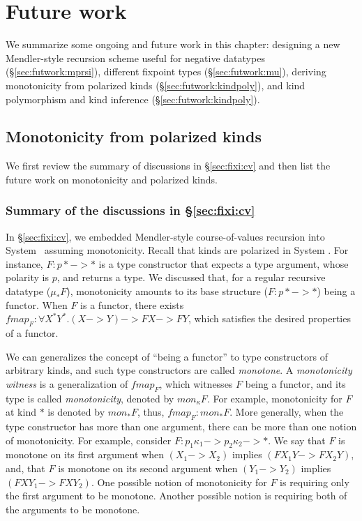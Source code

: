 \chapter{Future work}\label{ch:futwork}
We summarize some ongoing and future work in this chapter:
designing a new Mendler-style recursion scheme
useful for negative datatypes (\S\ref{sec:futwork:mprsi}),
different fixpoint types (\S\ref{sec:futwork:mu}),
deriving monotonicity from polarized kinds (\S\ref{sec:futwork:kindpoly}), and
kind polymorphism and kind inference (\S\ref{sec:futwork:kindpoly}).



\section{Monotonicity from polarized kinds}\label{sec:futwork:mon}
We first review the summary of discussions in \S\ref{sec:fixi:cv}
and then list the future work on monotonicity and polarized kinds.

\subsection*{Summary of the discussions in \S\ref{sec:fixi:cv}}
In \S\ref{sec:fixi:cv}, we embedded Mendler-style course-of-values recursion
into System \Fixi\ assuming monotonicity. Recall that kinds are polarized in
System \Fixi. For instance, $F: p* -> *$ is a type constructor that expects
a type argument, whose polarity is $p$, and returns a type. We discussed that,
for a regular recursive datatype ($\mu_{*} F$), monotonicity amounts to
its base structure ($F:p* -> *$) being a functor. When $F$ is a functor,
there exists $\textit{fmap}_F : \forall X^{*} Y^{*}. (X -> Y) -> F X -> F Y$,
which satisfies the desired properties of a functor.

We can generalizes the concept of ``being a functor''
to type constructors of arbitrary kinds, and such
type constructors are called \emph{monotone}.
A \emph{monotonicity witness} is a generalization of $\textit{fmap}_F$,
which witnesses $F$ being a functor, and its type is called \emph{monotonicity},
denoted by $\textit{mon}_{\kappa}F$. For example, monotonicity for $F$
at kind $*$ is denoted by $mon_{*}F$, thus, $\textit{fmap}_F : mon_{*} F$.
More generally, when the type constructor has more than one argument,
there can be more than one notion of monotonicity.
For example, consider $F : p_1\kappa_1 -> p_2\kappa_2 -> *$.
We say
that $F$ is monotone on its first argument
when $(X_1 -> X_2)$ implies $(F X_1 Y -> F X_2 Y)$, and,
that $F$ is monotone on its second argument
when $(Y_1 -> Y_2)$ implies $(F X Y_1 -> F X Y_2)$.
One possible notion of monotonicity for $F$ is requiring only the first
argument to be monotone. Another possible notion is requiring both of
the arguments to be monotone.

